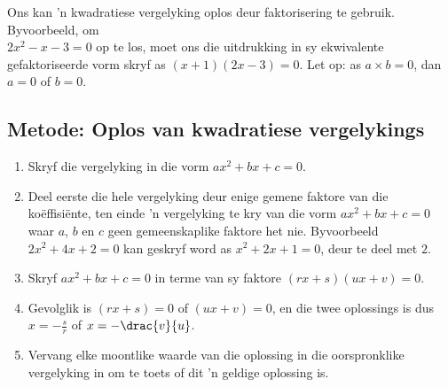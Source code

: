 Ons kan 'n kwadratiese vergelyking oplos deur faktorisering te gebruik. Byvoorbeeld, om \\$2{x}^{2}-x-3 = 0$ op te los, moet ons die uitdrukking in sy ekwivalente gefaktoriseerde vorm skryf as $(x+1)(2x-3)=0$. Let op: as $a \times b = 0$, dan $a = 0$ of $b=0$.\par




\subsection*{Metode: Oplos van kwadratiese vergelykings}
\begin{enumerate}[noitemsep, label=\textbf{\arabic*}. ] 
\item Skryf die vergelyking in die vorm $ax^{2} +bx +c =0$.
\item Deel eerste die hele vergelyking deur enige gemene faktore van die koëffisiënte, ten einde ’n vergelyking te kry van die vorm $a{x}^{2}+bx+c=0$ waar $a$, $b$ en
$c$ geen gemeenskaplike faktore het nie. Byvoorbeeld $2{x}^{2}+4x+2=0$ kan geskryf word as
${x}^{2}+2x+1=0$, deur te deel met $2$.
\item Skryf $a{x}^{2}+bx+c=0$ in terme van sy faktore  $(rx+s)(ux+v)=0$.

\item Gevolglik is $(rx+s)=0$ of $(ux+v)=0$, en die twee oplossings is dus $x = -\frac{s}{r}$ of $x=-\drac{v}{u}$.
\item Vervang elke moontlike waarde van die oplossing in die oorspronklike vergelyking in om te toets of dit ’n
geldige oplossing is.

\end{enumerate}


